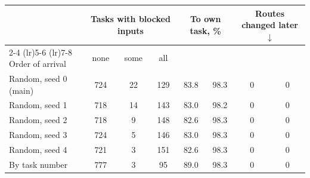 \begin{tabular}{lccccccc}
    \toprule
    & \multicolumn{3}{c}{Tasks with blocked inputs} & \multicolumn{2}{c}{To own task, \%} & \multicolumn{2}{c}{Routes changed later $\downarrow$} \\
    \cmidrule(lr){2-4} \cmidrule(lr){5-6} \cmidrule(lr){7-8}
    Order of arrival & none & some & all & \cert{} & \nearest{} & \cert{} & \nearest{} \\
    \midrule
    Random, seed 0 (main) & 724 & 22 & 129 & 83.8 & 98.3 & 0 & 0 \\
    Random, seed 1 & 718 & 14 & 143 & 83.0 & 98.2 & 0 & 0 \\
    Random, seed 2 & 718 & 9 & 148 & 82.6 & 98.3 & 0 & 0 \\
    Random, seed 3 & 724 & 5 & 146 & 83.0 & 98.3 & 0 & 0 \\
    Random, seed 4 & 721 & 3 & 151 & 82.6 & 98.3 & 0 & 0 \\
    By task number & 777 & 3 & 95 & 89.0 & 98.3 & 0 & 0 \\
    \bottomrule
\end{tabular}

